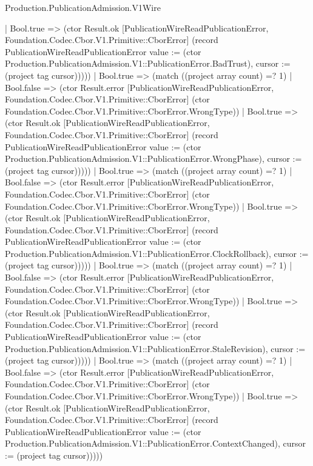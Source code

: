 \begin{lexlean}{Production.PublicationAdmission.V1Wire}
\begin{semanticmodule}
{                            | Bool.true => (ctor Result.ok [PublicationWireReadPublicationError, Foundation.Codec.Cbor.V1.Primitive::CborError] (record PublicationWireReadPublicationError {value := (ctor Production.PublicationAdmission.V1::PublicationError.BadTrust), cursor := (project tag cursor)}))))
                        | Bool.true => (match ((project array count) =? 1)
                          | Bool.false => (ctor Result.error [PublicationWireReadPublicationError, Foundation.Codec.Cbor.V1.Primitive::CborError] (ctor Foundation.Codec.Cbor.V1.Primitive::CborError.WrongType))
                          | Bool.true => (ctor Result.ok [PublicationWireReadPublicationError, Foundation.Codec.Cbor.V1.Primitive::CborError] (record PublicationWireReadPublicationError {value := (ctor Production.PublicationAdmission.V1::PublicationError.WrongPhase), cursor := (project tag cursor)}))))
                      | Bool.true => (match ((project array count) =? 1)
                        | Bool.false => (ctor Result.error [PublicationWireReadPublicationError, Foundation.Codec.Cbor.V1.Primitive::CborError] (ctor Foundation.Codec.Cbor.V1.Primitive::CborError.WrongType))
                        | Bool.true => (ctor Result.ok [PublicationWireReadPublicationError, Foundation.Codec.Cbor.V1.Primitive::CborError] (record PublicationWireReadPublicationError {value := (ctor Production.PublicationAdmission.V1::PublicationError.ClockRollback), cursor := (project tag cursor)}))))
                    | Bool.true => (match ((project array count) =? 1)
                      | Bool.false => (ctor Result.error [PublicationWireReadPublicationError, Foundation.Codec.Cbor.V1.Primitive::CborError] (ctor Foundation.Codec.Cbor.V1.Primitive::CborError.WrongType))
                      | Bool.true => (ctor Result.ok [PublicationWireReadPublicationError, Foundation.Codec.Cbor.V1.Primitive::CborError] (record PublicationWireReadPublicationError {value := (ctor Production.PublicationAdmission.V1::PublicationError.StaleRevision), cursor := (project tag cursor)}))))
                  | Bool.true => (match ((project array count) =? 1)
                    | Bool.false => (ctor Result.error [PublicationWireReadPublicationError, Foundation.Codec.Cbor.V1.Primitive::CborError] (ctor Foundation.Codec.Cbor.V1.Primitive::CborError.WrongType))
                    | Bool.true => (ctor Result.ok [PublicationWireReadPublicationError, Foundation.Codec.Cbor.V1.Primitive::CborError] (record PublicationWireReadPublicationError {value := (ctor Production.PublicationAdmission.V1::PublicationError.ContextChanged), cursor := (project tag cursor)}))))
}
\end{semanticmodule}
\end{lexlean}
